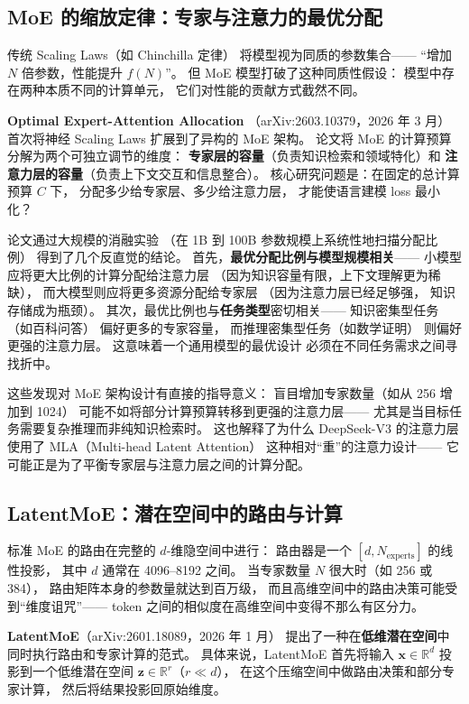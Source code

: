 \subsection{MoE 的缩放定律：专家与注意力的最优分配}

传统 Scaling Laws（如 Chinchilla 定律）
将模型视为同质的参数集合——
“增加 $N$ 倍参数，性能提升 $f(N)$”。
但 MoE 模型打破了这种同质性假设：
模型中存在两种本质不同的计算单元，
它们对性能的贡献方式截然不同。

\textbf{Optimal Expert-Attention Allocation}%
（arXiv:2603.10379，2026 年 3 月）
首次将神经 Scaling Laws 扩展到了异构的 MoE 架构。
论文将 MoE 的计算预算分解为两个可独立调节的维度：
\textbf{专家层的容量}（负责知识检索和领域特化）和
\textbf{注意力层的容量}（负责上下文交互和信息整合）。
核心研究问题是：在固定的总计算预算 $C$ 下，
分配多少给专家层、多少给注意力层，
才能使语言建模 loss 最小化？

论文通过大规模的消融实验
（在 1B 到 100B 参数规模上系统性地扫描分配比例）
得到了几个反直觉的结论。
首先，\textbf{最优分配比例与模型规模相关}——
小模型应将更大比例的计算分配给注意力层
（因为知识容量有限，上下文理解更为稀缺），
而大模型则应将更多资源分配给专家层
（因为注意力层已经足够强，
知识存储成为瓶颈）。
其次，最优比例也与\textbf{任务类型}密切相关——
知识密集型任务（如百科问答）
偏好更多的专家容量，
而推理密集型任务（如数学证明）
则偏好更强的注意力层。
这意味着一个通用模型的最优设计
必须在不同任务需求之间寻找折中。

这些发现对 MoE 架构设计有直接的指导意义：
盲目增加专家数量（如从 256 增加到 1024）
可能不如将部分计算预算转移到更强的注意力层——
尤其是当目标任务需要复杂推理而非纯知识检索时。
这也解释了为什么 DeepSeek-V3 的注意力层
使用了 MLA（Multi-head Latent Attention）
这种相对“重”的注意力设计——
它可能正是为了平衡专家层与注意力层之间的计算分配。

\subsection{LatentMoE：潜在空间中的路由与计算}

标准 MoE 的路由在完整的 $d$-维隐空间中进行：
路由器是一个 $[d, N_{\text{experts}}]$ 的线性投影，
其中 $d$ 通常在 4096--8192 之间。
当专家数量 $N$ 很大时（如 256 或 384），
路由矩阵本身的参数量就达到百万级，
而且高维空间中的路由决策可能受到“维度诅咒”——
token 之间的相似度在高维空间中变得不那么有区分力。

\textbf{LatentMoE}（arXiv:2601.18089，2026 年 1 月）%
提出了一种在\textbf{低维潜在空间}中同时执行路由和专家计算的范式。
具体来说，LatentMoE 首先将输入 $\mathbf{x} \in \mathbb{R}^d$
投影到一个低维潜在空间 $\mathbf{z} \in \mathbb{R}^r$（$r \ll d$），
在这个压缩空间中做路由决策和部分专家计算，
然后将结果投影回原始维度。

